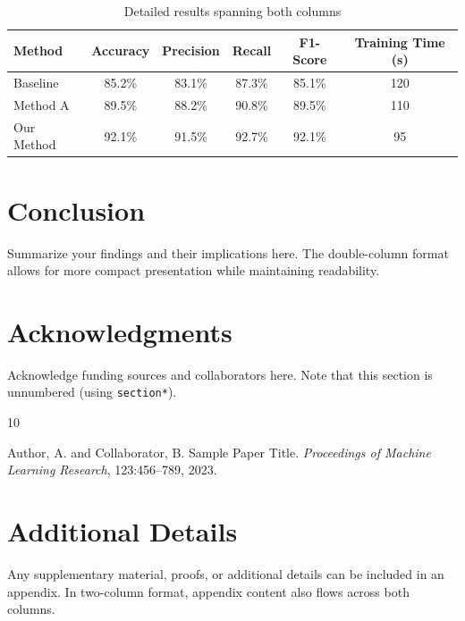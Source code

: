 \documentclass[pmlr,twocolumn]{jmlr} %
\begin{document}
\begin{table}[htbp]
  \centering
  \caption{Detailed results spanning both columns}
  \label{tab:detailed}
  \begin{tabular}{lccccc}
    \toprule
    Method & Accuracy & Precision & Recall & F1-Score & Training Time (s) \\
    \midrule
    Baseline & 85.2\% & 83.1\% & 87.3\% & 85.1\% & 120 \\
    Method A & 89.5\% & 88.2\% & 90.8\% & 89.5\% & 110 \\
    Our Method & 92.1\% & 91.5\% & 92.7\% & 92.1\% & 95 \\
    \bottomrule
  \end{tabular}
\end{table}

\section{Conclusion}

Summarize your findings and their implications here. The double-column
format allows for more compact presentation while maintaining
readability.

\section*{Acknowledgments}

Acknowledge funding sources and collaborators here. Note that this
section is unnumbered (using \texttt{section*}).



\begin{thebibliography}{10}

Author, A. and Collaborator, B.
\newblock Sample Paper Title.
\newblock \emph{Proceedings of Machine Learning Research}, 123:456--789, 2023.

\end{thebibliography}

\appendix
\section{Additional Details}

Any supplementary material, proofs, or additional details can be
included in an appendix. In two-column format, appendix content
also flows across both columns.
\end{document}
